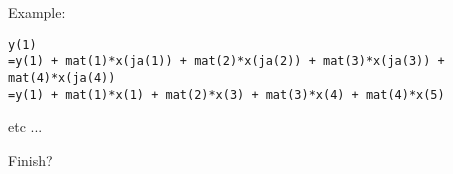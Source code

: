 Example:

\begin{verbatim}
y(1)
=y(1) + mat(1)*x(ja(1)) + mat(2)*x(ja(2)) + mat(3)*x(ja(3)) + mat(4)*x(ja(4)) 
=y(1) + mat(1)*x(1) + mat(2)*x(3) + mat(3)*x(4) + mat(4)*x(5) 
\end{verbatim}
etc ...

Finish?

 




